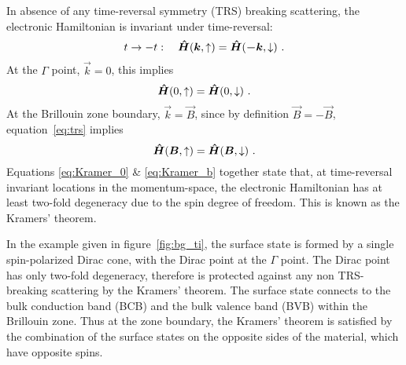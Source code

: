 In absence of any time-reversal symmetry (TRS) breaking scattering, the electronic Hamiltonian is invariant under time-reversal:%
\begin{equation}%
    t \to -t: \quad \op{H}(\vec{k}, \uparrow) = \op{H}(\vec{-k}, \downarrow)~.\label{eq:trs}%
\end{equation}%
At the $\Gamma$ point, $\vec{k}=0$, this implies%
\begin{equation}%
    \op{H}(0, \uparrow) = \op{H}(0, \downarrow)~.\label{eq:Kramer_0}%
\end{equation}%
At the Brillouin zone boundary, $\vec{k} = \vec{B}$, since by definition $\vec{B} = -\vec{B}$, equation~\ref{eq:trs} implies%
\begin{equation}%
    \op{H}(\vec{B}, \uparrow) = \op{H}(\vec{B}, \downarrow)~.\label{eq:Kramer_b}%
\end{equation}%
Equations \ref{eq:Kramer_0} \& \ref{eq:Kramer_b} together state that, at time-reversal invariant locations in the momentum-space, the electronic Hamiltonian has at least two-fold degeneracy due to the spin degree of freedom. This is known as the Kramers' theorem.

In the example given in figure~\ref{fig:bg_ti}, the surface state is formed by a single spin-polarized Dirac cone, with the Dirac point at the $\Gamma$ point. The Dirac point has only two-fold degeneracy, therefore is protected against any non TRS-breaking scattering by the Kramers' theorem. The surface state connects to the bulk conduction band (BCB) and the bulk valence band (BVB) within the Brillouin zone. Thus at the zone boundary, the Kramers' theorem is satisfied by the combination of the surface states on the opposite sides of the material, which have opposite spins.